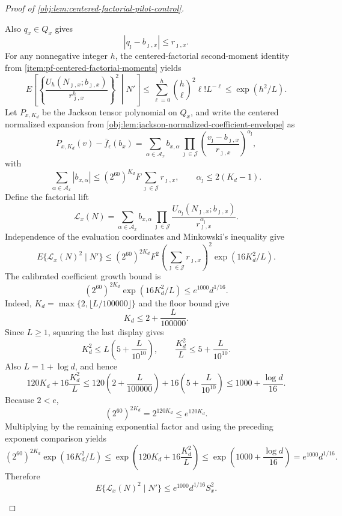 \documentclass[11pt]{article}
\begin{document}
\begin{proof}[Proof of \cref{obj:lem:centered-factorial-pilot-control}]
\begin{enumerate}
Also \(q_x\in Q_x\) gives
\[
|q_\jmath-b_{\jmath,x}|\le r_{\jmath,x}.
\]
For any nonnegative integer \(h\), the centered-factorial second-moment identity from \cref{item:pf-centered-factorial-moments} yields
\[
E\left[
\left\{
\frac{U_h(N_{\jmath,x};b_{\jmath,x})}{r_{\jmath,x}^h}
\right\}^2
\middle|N'
\right]
\le
\sum_{\ell=0}^{h}\binom h\ell^2\ell!L^{-\ell}
\le
\exp(h^2/L).
\]
Let \(P_{x,K_d}\) be the Jackson tensor polynomial on \(Q_x\), and write the centered normalized expansion from
\cref{obj:lem:jackson-normalized-coefficient-envelope} as
\[
P_{x,K_d}(v)-\bar f_\epsilon(b_x)
=
\sum_{\alpha\in\mathcal A_x}b_{x,\alpha}
\prod_{\jmath\in\mathcal J}
\left(\frac{v_\jmath-b_{\jmath,x}}{r_{\jmath,x}}\right)^{\alpha_\jmath},
\]
with
\[
\sum_{\alpha\in\mathcal A_x}|b_{x,\alpha}|
\le (2^{60})^{K_d}F\sum_{\jmath\in\mathcal J}r_{\jmath,x},
\qquad
\alpha_\jmath\le2(K_d-1).
\]
Define the factorial lift
\[
\mathcal L_x(N)
=
\sum_{\alpha\in\mathcal A_x}b_{x,\alpha}
\prod_{\jmath\in\mathcal J}
\frac{U_{\alpha_\jmath}(N_{\jmath,x};b_{\jmath,x})}
{r_{\jmath,x}^{\alpha_\jmath}} .
\]
Independence of the evaluation coordinates and Minkowski's inequality give
\[
E\{\mathcal L_x(N)^2\mid N'\}
\le
(2^{60})^{2K_d}F^2
\left(\sum_{\jmath\in\mathcal J}r_{\jmath,x}\right)^2
\exp(16K_d^2/L).
\]
The calibrated coefficient growth bound is
\[
(2^{60})^{2K_d}\exp(16K_d^2/L)
\le e^{1000}d^{1/16}.
\]
Indeed, \(K_d=\max\{2,\lfloor L/100000\rfloor\}\) and the floor bound give
\[
K_d\le 2+\frac{L}{100000}.
\]
Since \(L\ge1\), squaring the last display gives
\[
K_d^2\le L\left(5+\frac{L}{10^{10}}\right),
\qquad
\frac{K_d^2}{L}\le 5+\frac{L}{10^{10}}.
\]
Also \(L=1+\log d\), and hence
\[
120K_d+16\frac{K_d^2}{L}
\le
120\left(2+\frac{L}{100000}\right)
+16\left(5+\frac{L}{10^{10}}\right)
\le
1000+\frac{\log d}{16}.
\]
Because \(2<e\),
\[
(2^{60})^{2K_d}=2^{120K_d}\le e^{120K_d}.
\]
Multiplying by the remaining exponential factor and using the preceding exponent comparison yields
\[
(2^{60})^{2K_d}\exp(16K_d^2/L)
\le
\exp\left(120K_d+16\frac{K_d^2}{L}\right)
\le
\exp\left(1000+\frac{\log d}{16}\right)
=e^{1000}d^{1/16}.
\]
Therefore
\[
E\{\mathcal L_x(N)^2\mid N'\}
\le
e^{1000}d^{1/16}S_x^2 .
\]


\end{enumerate}
\end{proof}
\end{document}

